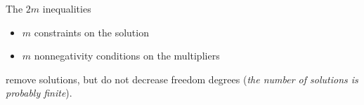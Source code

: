 The $2m$ inequalities
\begin{itemize}
	\item $m$ constraints on the solution
	
	\item $m$ nonnegativity conditions on the multipliers
\end{itemize}
remove solutions, but do not decrease freedom degrees (\textit{the number of solutions is probably finite}).

%
%
%	
%	
%	
%
%

